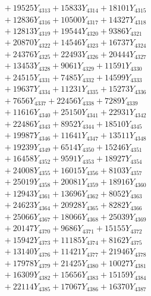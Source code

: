 \documentclass[a4paper,10pt]{article}
\begin{document}
{\begin{align}
&\;  + 19525 Y_{4313} + 15833 Y_{4314} + 18101 Y_{4315} \\[0.3ex]
&\;  + 12836 Y_{4316} + 10500 Y_{4317} + 14327 Y_{4318} \\[0.5ex]\allowbreak
&\;  + 12813 Y_{4319} + 19544 Y_{4320} + 9386 Y_{4321} \\[0.3ex]
&\;  + 20870 Y_{4322} + 14546 Y_{4323} + 16737 Y_{4324} \\[0.3ex]
&\;  + 24376 Y_{4325} + 22493 Y_{4326} + 20444 Y_{4327} \\[0.3ex]
&\;  + 13453 Y_{4328} + 9061 Y_{4329} + 11591 Y_{4330} \\[0.3ex]
&\;  + 24515 Y_{4331} + 7485 Y_{4332} + 14599 Y_{4333} \\[0.3ex]
&\;  + 19637 Y_{4334} + 11231 Y_{4335} + 15273 Y_{4336} \\[0.3ex]
&\;  + 7656 Y_{4337} + 22456 Y_{4338} + 7289 Y_{4339} \\[0.3ex]
&\;  + 11616 Y_{4340} + 25150 Y_{4341} + 22931 Y_{4342} \\[0.3ex]
&\;  + 22486 Y_{4343} + 8952 Y_{4344} + 18510 Y_{4345} \\[0.3ex]
&\;  + 19987 Y_{4346} + 11641 Y_{4347} + 13511 Y_{4348} \\[0.5ex]\allowbreak
&\;  + 19239 Y_{4349} + 6514 Y_{4350} + 15246 Y_{4351} \\[0.3ex]
&\;  + 16458 Y_{4352} + 9591 Y_{4353} + 18927 Y_{4354} \\[0.3ex]
&\;  + 24008 Y_{4355} + 16015 Y_{4356} + 8103 Y_{4357} \\[0.3ex]
&\;  + 25019 Y_{4358} + 20081 Y_{4359} + 18916 Y_{4360} \\[0.3ex]
&\;  + 12943 Y_{4361} + 13696 Y_{4362} + 8052 Y_{4363} \\[0.3ex]
&\;  + 24623 Y_{4364} + 20928 Y_{4365} + 8282 Y_{4366} \\[0.3ex]
&\;  + 25066 Y_{4367} + 18066 Y_{4368} + 25039 Y_{4369} \\[0.3ex]
&\;  + 20147 Y_{4370} + 9686 Y_{4371} + 15155 Y_{4372} \\[0.3ex]
&\;  + 15942 Y_{4373} + 11185 Y_{4374} + 8162 Y_{4375} \\[0.3ex]
&\;  + 13140 Y_{4376} + 11421 Y_{4377} + 21946 Y_{4378} \\[0.5ex]\allowbreak
&\;  + 17978 Y_{4379} + 21425 Y_{4380} + 10027 Y_{4381} \\[0.3ex]
&\;  + 16309 Y_{4382} + 15656 Y_{4383} + 15159 Y_{4384} \\[0.3ex]
&\;  + 22114 Y_{4385} + 17067 Y_{4386} + 16370 Y_{4387} \\[0.3ex]

\end{align}}
\end{document}
